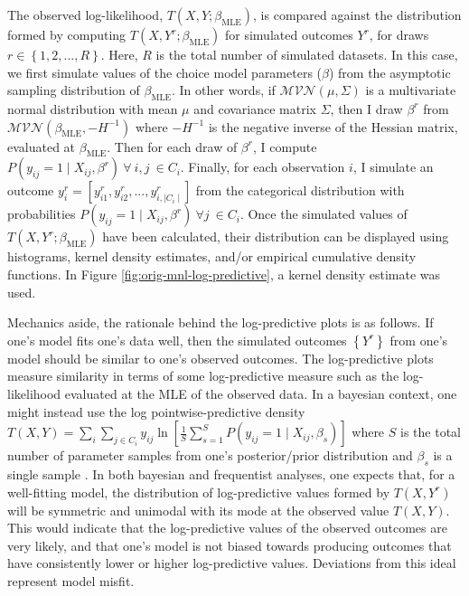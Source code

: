 \documentclass[preprint]{elsarticle}
\begin{document}
The observed log-likelihood, $T \left( X, Y; \beta _{\textrm{MLE}} \right)$, is compared against the distribution formed by computing $T \left( X, Y^r; \beta _{\textrm{MLE}} \right)$ for simulated outcomes $Y^r$, for draws $r \in \left\lbrace 1, 2, ..., R \right\rbrace$. Here, $R$ is the total number of simulated datasets. In this case, we first simulate values of the choice model parameters ($\beta$) from the asymptotic sampling distribution of $\beta _{\textrm{MLE}}$. In other words, if $\mathcal{MVN} \left( \mu, \Sigma \right)$ is a multivariate normal distribution with mean $\mu$ and covariance matrix $\Sigma$, then I draw $\beta ^r$ from $\mathcal{MVN} \left(  \beta _{\textrm{MLE}}, -H^{-1} \right)$ where $-H^{-1}$ is the negative inverse of the Hessian matrix, evaluated at $\beta _{\textrm{MLE}}$. Then for each draw of $\beta ^r$, I compute $P \left( y_{ij} = 1 \mid X_{ij}, \beta ^r \right) \ \forall \  i, j \ \in C_i$. Finally, for each observation $i$, I simulate an outcome $y ^r_i = \left[ y ^r _{i1}, y ^r _{i2}, ..., y ^r _{i, \mid C_i \mid} \right]$ from the categorical distribution with probabilities $P \left( y_{ij} = 1 \mid X_{ij}, \beta ^r \right) \  \forall j \ \in C_i$. Once the simulated values of $T \left( X, Y^r; \beta _{\textrm{MLE}} \right)$ have been calculated, their distribution can be displayed using histograms, kernel density estimates, and/or empirical cumulative density functions. In Figure \ref{fig:orig-mnl-log-predictive}, a kernel density estimate was used.

Mechanics aside, the rationale behind the log-predictive plots is as follows. If one's model fits one's data well, then the simulated outcomes $\left\lbrace Y^r \right\rbrace$ from one's model should be similar to one's observed outcomes. The log-predictive plots measure similarity in terms of some log-predictive measure such as the log-likelihood evaluated at the MLE of the observed data. In a bayesian context, one might instead use the log pointwise-predictive density $T \left( X, Y \right) = \sum _i \sum _{j \in C_i} y_{ij} \ln \left[ \frac{1}{S }\sum _{s=1} ^S P \left( y_{ij} = 1 \mid X_{ij}, \beta _s \right) \right]$ where $S$ is the total number of parameter samples from one's posterior/prior distribution and $\beta _s$ is a single sample \citep[p.169]{gelman_bayesian_2014}. In both bayesian and frequentist analyses, one expects that, for a well-fitting model, the distribution of log-predictive values formed by $T \left( X, Y^r \right)$ will be symmetric and unimodal with its mode at the observed value $T \left( X, Y \right)$. This would indicate that the log-predictive values of the observed outcomes are very likely, and that one's model is not biased towards producing outcomes that have consistently lower or higher log-predictive values. Deviations from this ideal represent model misfit.
\end{document}
